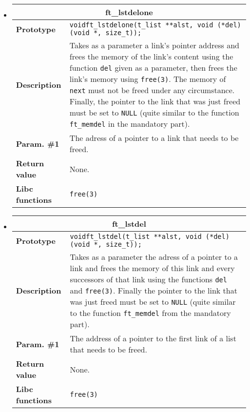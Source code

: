 \documentclass{42-en}
\begin{document}
\begin{itemize}
            \item \begin{tabular}{|l|p{11cm}|}
                \hline
                \multicolumn{2}{|c|}{\textbf{ft\_lstdelone}}\\
                \hline
                \textbf{Prototype} &
                \texttt{void\hspace{5mm}ft\_lstdelone(t\_list **alst,
                  void (*del)(void *, size\_t));}\\
                \hline
                \textbf{Description} & Takes as a parameter a link's
                pointer address and frees the memory of the link's
                content using the function \texttt{del} given as
                a parameter, then frees the link's memory using \texttt{free(3)}.
                The memory of \texttt{next} must not be freed under any circumstance. Finally,
                the pointer to the link that was just freed must be
                set to \texttt{NULL} (quite similar to the function
                \texttt{ft\_memdel} in the mandatory part).\\
                \hline
                \textbf{Param. \#1} & The adress of a pointer to a link
                that needs to be freed.\\
                \hline
                \textbf{Return value} & None.\\
                \hline
                \textbf{Libc functions} & \texttt{free(3)}\\
                \hline
            \end{tabular}

            \item \begin{tabular}{|l|p{11cm}|}
                \hline
                \multicolumn{2}{|c|}{\textbf{ft\_lstdel}}\\
                \hline
                \textbf{Prototype} &
                \texttt{void\hspace{5mm}ft\_lstdel(t\_list **alst,
                  void (*del)(void *, size\_t));}\\
                \hline
                \textbf{Description} & Takes as a parameter the adress of a pointer to a link
                and frees the memory of this link and
                every successors of that link using the functions \texttt{del}
                and \texttt{free(3)}. Finally the pointer to the
                link that was just freed must be set to \texttt{NULL}
                (quite similar to the function \texttt{ft\_memdel}
                from the mandatory part).\\
                \hline
                \textbf{Param. \#1} & The address of a pointer to the
                first link of a list that needs to be freed.\\
                \hline
                \textbf{Return value} & None.\\
                \hline
                \textbf{Libc functions} & \texttt{free(3)}\\
                \hline
            \end{tabular}


\end{itemize}
\end{document}
